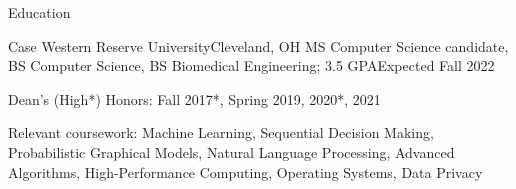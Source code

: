 \begin{rsection}{Education}
\begin{ritemize}
{Case Western Reserve University}{Cleveland, OH}
{MS Computer Science candidate, BS Computer Science, BS Biomedical Engineering; 3.5 GPA}{Expected Fall 2022}
	\item Dean's (High*) Honors: Fall 2017*, Spring 2019, 2020*, 2021
	\item Relevant coursework:
	Machine Learning,
	Sequential Decision Making,
	Probabilistic Graphical Models,
	Natural Language Processing,
	Advanced Algorithms,
	High-Performance Computing,
	Operating Systems,
	Data Privacy
\end{ritemize}
\end{rsection}